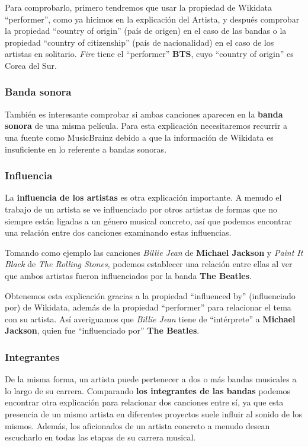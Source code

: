 Para comprobarlo, primero tendremos que usar la propiedad de Wikidata ``performer'', como ya hicimos en la explicación del Artista, y después comprobar la propiedad ``country of origin'' (país de origen) en el caso de las bandas o la propiedad ``country of citizenship'' (país de nacionalidad) en el caso de los artistas en solitario. \textit{Fire} tiene el ``performer'' \textbf{BTS}, cuyo ``country of origin'' es Corea del Sur.

\subsubsection*{Banda sonora}

También es interesante comprobar si ambas canciones aparecen en la \textbf{banda sonora} de una misma película. Para esta explicación necesitaremos recurrir a una fuente como MusicBrainz debido a que la información de Wikidata es insuficiente en lo referente a bandas sonoras.

\subsubsection*{Influencia}

La \textbf{influencia de los artistas} es otra explicación importante. A menudo el trabajo de un artista se ve influenciado por otros artistas de formas que no siempre están ligadas a un género musical concreto, así que podemos encontrar una relación entre dos canciones examinando estas influencias.

Tomando como ejemplo las canciones \textit{Billie Jean} de \textbf{Michael Jackson} y \textit{Paint It Black} de \textit{The Rolling Stones}, podemos establecer una relación entre ellas al ver que ambos artistas fueron influenciados por la banda \textbf{The Beatles}.

Obtenemos esta explicación gracias a la propiedad ``influenced by'' (influenciado por) de Wikidata, además de la propiedad ``performer'' para relacionar el tema con su artista. Así averiguamos que \textit{Billie Jean} tiene de ``intérprete'' a \textbf{Michael Jackson}, quien fue ``influenciado por'' \textbf{The Beatles}.

\subsubsection*{Integrantes}

De la misma forma, un artista puede pertenecer a dos o más bandas musicales a lo largo de su carrera. Comparando \textbf{los integrantes de las bandas} podemos encontrar otra explicación para relacionar dos canciones entre sí, ya que esta presencia de un mismo artista en diferentes proyectos suele influir al sonido de los mismos. Además, los aficionados de un artista concreto a menudo desean escucharlo en todas las etapas de su carrera musical.

